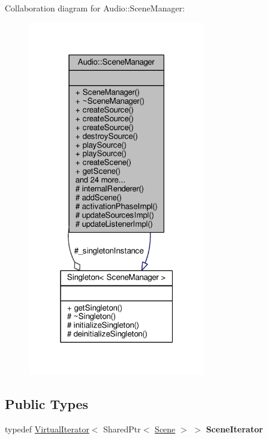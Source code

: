 Collaboration diagram for Audio\+:\+:Scene\+Manager\+:
\nopagebreak
\begin{figure}[H]
\begin{center}
\leavevmode
\includegraphics[width=220pt]{da/d94/classAudio_1_1SceneManager__coll__graph}
\end{center}
\end{figure}
\subsection*{Public Types}
\begin{DoxyCompactItemize}
\item 
typedef \hyperlink{classAudio_1_1VirtualIterator}{Virtual\+Iterator}$<$ Shared\+Ptr$<$ \hyperlink{classAudio_1_1Scene}{Scene} $>$ $>$ {\bfseries Scene\+Iterator}\hypertarget{classAudio_1_1SceneManager_af5001ad5e5b2e9512dcf6830ed9f7afe}{}\label{classAudio_1_1SceneManager_af5001ad5e5b2e9512dcf6830ed9f7afe}

\end{DoxyCompactItemize}
